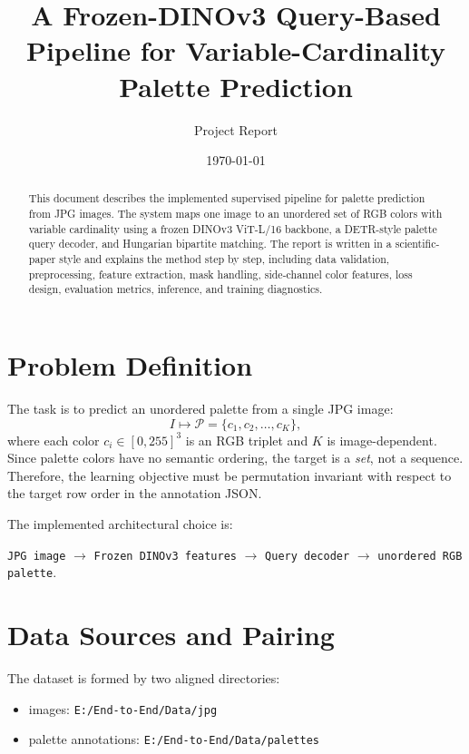 \documentclass[11pt,a4paper]{article}
\title{A Frozen-DINOv3 Query-Based Pipeline for Variable-Cardinality Palette Prediction}
\author{Project Report}
\date{\today}
\begin{document}
\maketitle

\begin{abstract}
This document describes the implemented supervised pipeline for palette prediction from JPG images. The system maps one image to an unordered set of RGB colors with variable cardinality using a frozen DINOv3 ViT-L/16 backbone, a DETR-style palette query decoder, and Hungarian bipartite matching. The report is written in a scientific-paper style and explains the method step by step, including data validation, preprocessing, feature extraction, mask handling, side-channel color features, loss design, evaluation metrics, inference, and training diagnostics.
\end{abstract}

\section{Problem Definition}

The task is to predict an unordered palette from a single JPG image:
\begin{equation}
I \mapsto \mathcal{P} = \{c_1, c_2, \dots, c_K\},
\end{equation}
where each color $c_i \in [0,255]^3$ is an RGB triplet and $K$ is image-dependent. Since palette colors have no semantic ordering, the target is a \emph{set}, not a sequence. Therefore, the learning objective must be permutation invariant with respect to the target row order in the annotation JSON.

The implemented architectural choice is:
\begin{center}
\texttt{JPG image} $\rightarrow$ \texttt{Frozen DINOv3 features} $\rightarrow$ \texttt{Query decoder} $\rightarrow$ \texttt{unordered RGB palette}.
\end{center}

\section{Data Sources and Pairing}

The dataset is formed by two aligned directories:
\begin{itemize}[leftmargin=2em]
    \item images: \texttt{E:/End-to-End/Data/jpg}
    \item palette annotations: \texttt{E:/End-to-End/Data/palettes}
\end{itemize}
\end{document}
